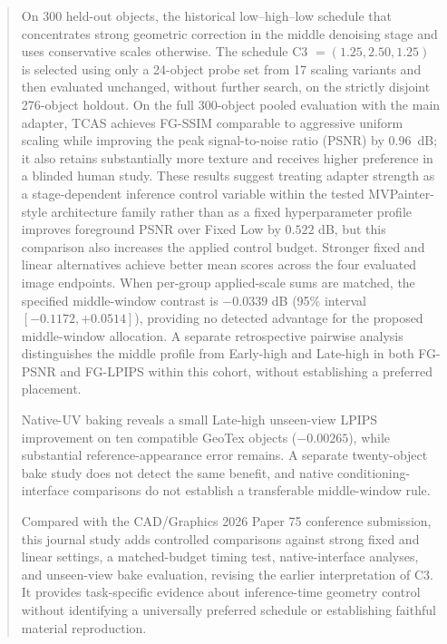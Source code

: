 \documentclass[times,twocolumn,final]{elsarticle}
\providecommand{\DIFadd}[1]{{\protect\color{blue} \sf #1}} %
\providecommand{\DIFdel}[1]{{\protect\color{red} \scriptsize #1}} %
\providecommand{\DIFaddbegin}{} %
\providecommand{\DIFaddend}{} %
\providecommand{\DIFdelbegin}{} %
\providecommand{\DIFdelend}{} %
\begin{document}
\begin{frontmatter}
\begin{abstract}
\DIFadd{On 300 held-out objects, the historical }\DIFaddend low--high--low \DIFdelbegin \DIFdel{schedule that concentrates strong geometric correction in the middle denoising stage and uses conservative scales otherwise. The schedule }\DIFdelend C3 \DIFdelbegin \DIFdel{$=(1.25, 2.50, 1.25)$ is selected using only a 24-object probe set from 17 scaling variants and then evaluated unchanged, without further search, on the strictly disjoint 276-object holdout. On the full 300-object pooled evaluation with the main adapter, TCAS achieves FG-SSIM comparable to aggressive uniform scaling while improving the peak signal-to-noise ratio (PSNR) by 0.96~dB; it also retains substantially more texture and receives higher preference in a blinded human study. These results suggest treating adapter strength as a stage-dependent inference control variable within the tested MVPainter-style architecture family rather than as a fixed hyperparameter}\DIFdelend \DIFaddbegin \DIFadd{profile improves foreground PSNR over Fixed Low by $0.522$ dB, but this comparison also increases the applied control budget. Stronger fixed and linear alternatives achieve better mean scores across the four evaluated image endpoints. When per-group applied-scale sums are matched, the specified middle-window contrast is $-0.0339$ dB (95\% interval $[-0.1172,+0.0514]$), providing no detected advantage for the proposed middle-window allocation. A separate retrospective pairwise analysis distinguishes the middle profile from Early-high and Late-high in both FG-PSNR and FG-LPIPS within this cohort, without establishing a preferred placement.
}

\DIFadd{Native-UV baking reveals a small Late-high unseen-view LPIPS improvement on ten compatible GeoTex objects ($-0.00265$), while substantial reference-appearance error remains. A separate twenty-object bake study does not detect the same benefit, and native conditioning-interface comparisons do not establish a transferable middle-window rule.
}

\DIFadd{Compared with the CAD/Graphics 2026 Paper 75 conference submission, this journal study adds controlled comparisons against strong fixed and linear settings, a matched-budget timing test, native-interface analyses, and unseen-view bake evaluation, revising the earlier interpretation of C3. It provides task-specific evidence about inference-time geometry control without identifying a universally preferred schedule or establishing faithful material reproduction}\DIFaddend .
\end{abstract}


\end{frontmatter}
\end{document}
